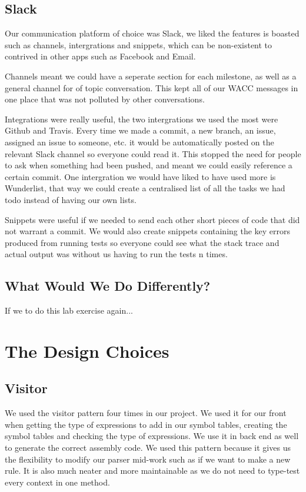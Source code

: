 \documentclass[11pt,a4paper]{article}
\begin{document}
\subsection{Slack}
\label{sub:Slack}
Our communication platform of choice was Slack, we liked the features is boasted such as channels, intergrations and snippets, which can be non-existent to contrived in other apps such as Facebook and Email.

Channels meant we could have a seperate section for each milestone, as well as a general channel for of topic conversation. This kept all of our WACC messages in one place that was not polluted by other conversations.

Integrations were really useful, the two intergrations we used the most were Github and Travis. Every time we made a commit, a new branch, an issue, assigned an issue to someone, etc. it would be automatically posted on the relevant Slack channel so everyone could read it. This stopped the need for people to ask when something had been pushed, and meant we could easily reference a certain commit. One intergration we would have liked to have used more is Wunderlist, that way we could create a centralised list of all the tasks we had todo instead of having our own lists.

Snippets were useful if we needed to send each other short pieces of code that did not warrant a commit. We would also create snippets containing the key errors produced from running tests so everyone could see what the stack trace and actual output was without us having to run the tests n times.

\subsection{What Would We Do Differently?}
\label{sub:What Would We Do Differently?}

If we to do this lab exercise again...

\section{The Design Choices}
\label{sec:The Design Choices}

\subsection{Visitor}
\label{sub:Visitor}
We used the visitor pattern four times in our project. We used it for our front when getting the type of expressions to add in our symbol tables, creating the symbol tables and checking the type of expressions. We use it in back end as well to generate the correct assembly code. We used this pattern because it gives us the flexibility to modify our parser mid-work such as if we want to make a new rule. It is also much neater and more maintainable as we do not need 
to type-test every context in one method.
\end{document}
